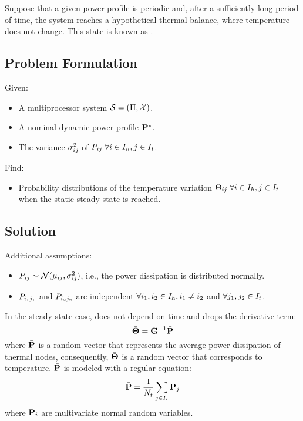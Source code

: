 Suppose that a given power profile is periodic and, after a sufficiently long period of time, the system reaches a hypothetical thermal balance, where temperature does not change. This state is known as .

\subsection{Problem Formulation}
Given:
\begin{itemize}
  \item A multiprocessor system $\mathcal{S} = (\Pi, \mathcal{X})$.
  \item A nominal dynamic power profile $\mathbf{P}^\star$.
  \item The variance $\sigma_{ij}^2$ of $P_{ij} \; \forall i \in I_h, j \in I_t$.
\end{itemize}

Find:
\begin{itemize}
  \item Probability distributions of the temperature variation $\Theta_{ij} \; \forall i \in I_h, j \in I_t$ when the static steady state is reached.
\end{itemize}

\subsection{Solution} 
Additional assumptions:
\begin{itemize}
  \item $P_{ij} \sim \mathcal{N}(\mu_{ij}, \sigma_{ij}^2)$, i.e., the power dissipation is distributed normally.
  \item $P_{i_1 j_1}$ and $P_{i_2 j_2}$ are independent $\forall i_1, i_2 \in I_h,  i_1 \neq i_2$ and $\forall j_1, j_2 \in I_t$.
\end{itemize}

In the steady-state case,  does not depend on time and drops the derivative term:
\begin{equation} \equlabel{steady-fourier}
  \a{\vtemperature} = \mconductance^{-1} \a{\vpower}
\end{equation}
where $\bar{\mathbf{P}}$ is a random vector that represents the average power dissipation of thermal nodes, consequently, $\bar{\mathbf{\Theta}}$ is a random vector that corresponds to temperature. $\bar{\mathbf{P}}$ is modeled with a regular equation:
\[
  \bar{\mathbf{P}} = \frac{1}{N_t} \sum_{j \in I_t} \mathbf{P}_j
\]
where $\mathbf{P}_i$ are multivariate normal random variables.

